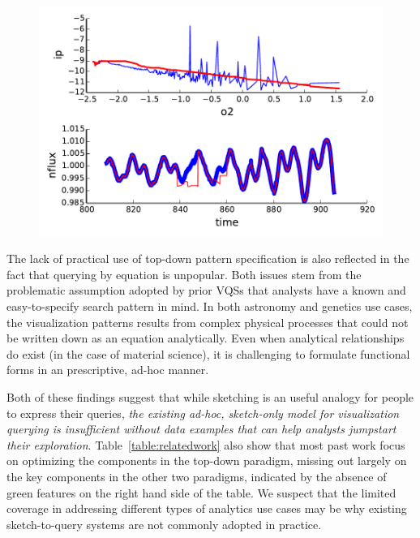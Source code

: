\begin{figure}[ht!]
    \centering
    \includegraphics[width=\columnwidth]{figures/QueryModificationBySketch.pdf}
    \caption{
    \label{query_modification}}
    \vspace{-10pt}
\end{figure}
\par The lack of practical use of top-down pattern specification is also reflected in the fact that querying by equation is unpopular. Both issues stem from the problematic assumption adopted by prior VQSs that analysts have a known and easy-to-specify search pattern in mind. In both astronomy and genetics use cases, the visualization patterns results from complex physical processes that could not be written down as an equation analytically. Even when analytical relationships do exist (in the case of material science), it is challenging to formulate functional forms in an prescriptive, ad-hoc manner.
\par Both of these findings suggest that while sketching is an useful analogy for people to express their queries, \emph{the existing ad-hoc, sketch-only model for visualization querying is insufficient without data examples that can help analysts jumpstart their exploration}. Table~\ref{table:relatedwork} also show that most past work focus on optimizing the components in the top-down paradigm, missing out largely on the key components in the other two paradigms, indicated by the absence of green features on the right hand side of the table. We suspect that the limited coverage in addressing different types of analytics use cases may be why existing sketch-to-query systems are not commonly adopted in practice. %
